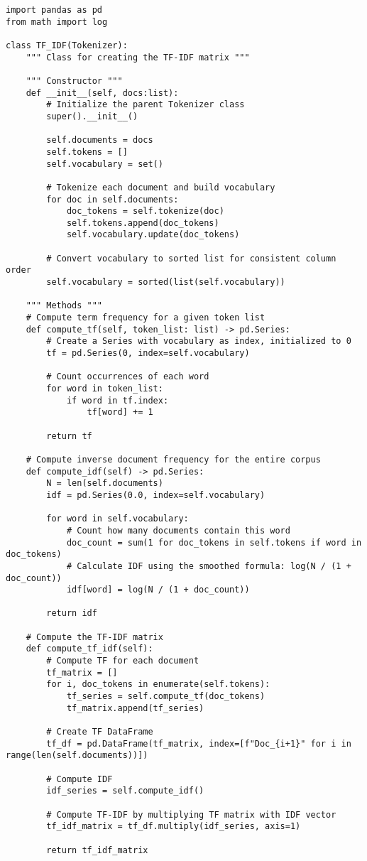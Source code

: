 \documentclass[12pt,a4paper]{article}
\begin{document}
\begin{lstlisting}[caption=Clase TF-IDF]
import pandas as pd
from math import log

class TF_IDF(Tokenizer):
    """ Class for creating the TF-IDF matrix """
    
    """ Constructor """
    def __init__(self, docs:list):
        # Initialize the parent Tokenizer class
        super().__init__() 
        
        self.documents = docs
        self.tokens = []
        self.vocabulary = set()
        
        # Tokenize each document and build vocabulary
        for doc in self.documents:
            doc_tokens = self.tokenize(doc)
            self.tokens.append(doc_tokens)
            self.vocabulary.update(doc_tokens)

        # Convert vocabulary to sorted list for consistent column order
        self.vocabulary = sorted(list(self.vocabulary))

    """ Methods """
    # Compute term frequency for a given token list
    def compute_tf(self, token_list: list) -> pd.Series:
        # Create a Series with vocabulary as index, initialized to 0
        tf = pd.Series(0, index=self.vocabulary)
        
        # Count occurrences of each word
        for word in token_list:
            if word in tf.index:
                tf[word] += 1
        
        return tf
    
    # Compute inverse document frequency for the entire corpus
    def compute_idf(self) -> pd.Series:
        N = len(self.documents)
        idf = pd.Series(0.0, index=self.vocabulary)
        
        for word in self.vocabulary:
            # Count how many documents contain this word
            doc_count = sum(1 for doc_tokens in self.tokens if word in doc_tokens)
            # Calculate IDF using the smoothed formula: log(N / (1 + doc_count))
            idf[word] = log(N / (1 + doc_count))
        
        return idf

    # Compute the TF-IDF matrix
    def compute_tf_idf(self):
        # Compute TF for each document
        tf_matrix = []
        for i, doc_tokens in enumerate(self.tokens):
            tf_series = self.compute_tf(doc_tokens)
            tf_matrix.append(tf_series)
        
        # Create TF DataFrame
        tf_df = pd.DataFrame(tf_matrix, index=[f"Doc_{i+1}" for i in range(len(self.documents))])
        
        # Compute IDF
        idf_series = self.compute_idf()
        
        # Compute TF-IDF by multiplying TF matrix with IDF vector
        tf_idf_matrix = tf_df.multiply(idf_series, axis=1)
        
        return tf_idf_matrix
\end{lstlisting}
\end{document}
